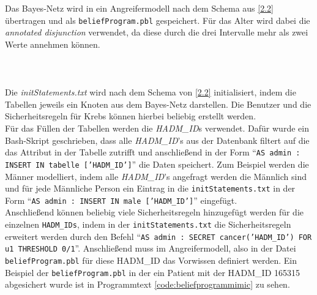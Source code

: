 \documentclass[german,version-2020-11]{uzl-thesis}
\begin{document}
\begin{figure}[ht]
\end{figure}Das Bayes-Netz wird in ein Angreifermodell nach dem Schema aus \ref{2.2} übertragen und als \texttt{beliefProgram.pbl} gespeichert. Für das Alter wird dabei die \textit{annotated disjunction} verwendet, da diese durch die drei Intervalle mehr als zwei Werte annehmen können. \\ \\ \\ \\
Die \textit{initStatements.txt} wird nach dem Schema von \ref{2.2} initialisiert, indem die Tabellen jeweils ein Knoten aus dem Bayes-Netz darstellen. Die Benutzer und die Sicherheitsregeln für Krebs können hierbei beliebig erstellt werden.\\  Für das Füllen der Tabellen werden die \textit{HADM\_ID}s verwendet. Dafür wurde ein Bash-Skript geschrieben, dass alle \textit{HADM\_ID}'s  aus der Datenbank filtert auf die das Attribut in der Tabelle zutrifft und anschließend in der Form \enquote{\texttt{AS admin : INSERT IN tabelle ['HADM\_ID']}} die Daten speichert. Zum Beispiel werden die Männer modelliert, indem alle \textit{HADM\_ID}'s angefragt werden die Männlich sind und für jede Männliche Person ein Eintrag in die \texttt{initStatements.txt} in der Form \enquote{\texttt{AS admin : INSERT IN male ['HADM\_ID']}} eingefügt. \\ 
Anschließend können beliebig viele Sicherheitsregeln hinzugefügt werden für die einzelnen \texttt{HADM\_IDs}, indem in der \texttt{initStatements.txt} die Sicherheitsregeln erweitert werden durch den Befehl \enquote{\texttt{AS admin : SECRET cancer('HADM\_ID') FOR u1 THRESHOLD 0/1}}. Anschließend muss im Angreifermodell, also in der Datei \texttt{beliefProgram.pbl} für diese HADM\_ID das Vorwissen definiert werden. Ein Beispiel der \texttt{beliefProgram.pbl} in der ein Patient mit der HADM\_ID 165315 abgesichert wurde ist in Programmtext  \ref{code:beliefprogrammimic} zu sehen. \\
\end{document}
